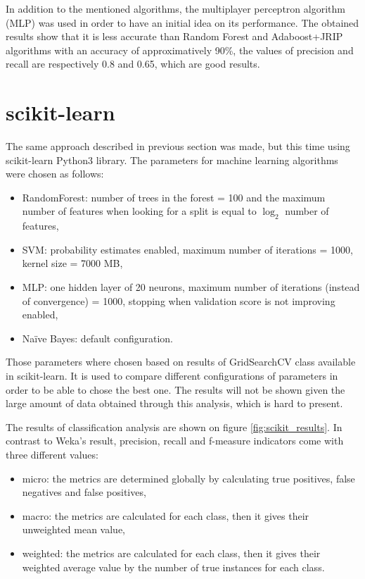 In addition to the mentioned algorithms, the multiplayer perceptron algorithm (MLP) was used in order to have an initial idea on its performance. The obtained results show that it is less accurate than Random Forest and Adaboost+JRIP algorithms with an accuracy of approximatively 90\%, the values of precision and recall are respectively 0.8 and 0.65, which are good results.

\section{scikit-learn} \label{sec:scikit_in_chap:methods}
The same approach described in previous section was made, but this time using scikit-learn Python3 library. The parameters for machine learning algorithms were chosen as follows:
\begin{itemize}
    \item RandomForest: number of trees in the forest = 100 and the maximum number of features when looking for a split is equal to $\log_2$ number of features,
    \item SVM: probability estimates enabled, maximum number of iterations = 1000, kernel size = 7000 MB,
    \item MLP: one hidden layer of 20 neurons, maximum number of iterations (instead of convergence) = 1000, stopping when validation score is not improving enabled,
    \item Naïve Bayes: default configuration.
\end{itemize}
Those parameters where chosen based on results of GridSearchCV class available in scikit-learn. It is used to compare different configurations of parameters in order to be able to chose the best one. The results will not be shown given the large amount of data obtained through this analysis, which is hard to present.

The results of classification analysis are shown on figure \ref{fig:scikit_results}. In contrast to Weka's result, precision, recall and f-measure indicators come with three different values:
\begin{itemize}
    \item micro: the metrics are determined globally by calculating true positives, false negatives and false positives,
    \item macro: the metrics are calculated for each class, then it gives their unweighted mean value,
    \item weighted: the metrics are calculated for each class, then it gives their weighted average value by the number of true instances for each class.
\end{itemize}

